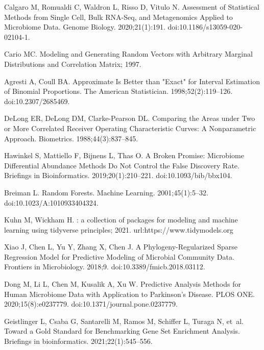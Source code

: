 \documentclass[10pt,letterpaper]{article}
\begin{document}
\begin{thebibliography}{10}
Calgaro M, Romualdi C, Waldron L, Risso D, Vitulo N.
\newblock Assessment of Statistical Methods from Single Cell, Bulk {{RNA}}-Seq,
  and Metagenomics Applied to Microbiome Data.
\newblock Genome Biology. 2020;21(1):191.
\newblock doi:{10.1186/s13059-020-02104-1}.

Cario MC.
\newblock Modeling and {{Generating Random Vectors}} with {{Arbitrary Marginal
  Distributions}} and {{Correlation Matrix}}; 1997.

Agresti A, Coull BA.
\newblock Approximate {{Is Better}} than "{{Exact}}" for {{Interval
  Estimation}} of {{Binomial Proportions}}.
\newblock The American Statistician. 1998;52(2):119--126.
\newblock doi:{10.2307/2685469}.

DeLong ER, DeLong DM, {Clarke-Pearson} DL.
\newblock Comparing the Areas under Two or More Correlated Receiver Operating
  Characteristic Curves: A Nonparametric Approach.
\newblock Biometrics. 1988;44(3):837--845.

Hawinkel S, Mattiello F, Bijnens L, Thas O.
\newblock A Broken Promise: Microbiome Differential Abundance Methods Do Not
  Control the False Discovery Rate.
\newblock Briefings in Bioinformatics. 2019;20(1):210--221.
\newblock doi:{10.1093/bib/bbx104}.

Breiman L.
\newblock Random {{Forests}}.
\newblock Machine Learning. 2001;45(1):5--32.
\newblock doi:{10.1023/A:1010933404324}.

Kuhn M, Wickham H.
: a collection of packages for modeling and machine learning using tidyverse        principles; 2021.
\newblock url:{https://www.tidymodels.org}

Xiao J, Chen L, Yu Y, Zhang X, Chen J.
\newblock A {{Phylogeny}}-{{Regularized Sparse Regression Model}} for
  {{Predictive Modeling}} of {{Microbial Community Data}}.
\newblock Frontiers in Microbiology. 2018;9.
\newblock doi:{10.3389/fmicb.2018.03112}.

Dong M, Li L, Chen M, Kusalik A, Xu W.
\newblock Predictive Analysis Methods for Human Microbiome Data with
  Application to {{Parkinson}}'s Disease.
\newblock PLOS ONE. 2020;15(8):e0237779.
\newblock doi:{10.1371/journal.pone.0237779}.

Geistlinger L, Csaba G, Santarelli M, Ramos M, Schiffer L, Turaga N, et~al.
\newblock Toward a Gold Standard for Benchmarking Gene Set Enrichment Analysis.
\newblock Briefings in bioinformatics. 2021;22(1):545--556.


\end{thebibliography}
\end{document}
